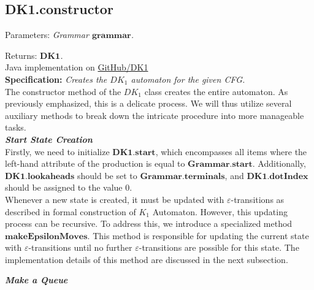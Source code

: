 \vspace{10pt}

\subsection{DK1.constructor}

Parameters: \textit{Grammar \(\boldsymbol{grammar}\).}

Returns: \textit{\(\boldsymbol{DK1}\).}\\

Java implementation on \href{https://github.com/fyfsb/dcfg/blob/main/src/main/java/dk/DK1.java}{GitHub/DK1}\\

\textbf{Specification:} \textit{Creates the \(DK_{1}\) automaton for the given CFG.}\\

The constructor method of the \(DK_{1}\) class creates the entire automaton. As previously emphasized, this is a delicate process. We will thus utilize several auxiliary methods to break down the intricate procedure into more manageable tasks.\\

\textbf{\textit{Start State Creation}}\\

Firstly, we need to initialize \(\boldsymbol{DK1.start}\), which encompasses all items where the left-hand attribute of the production is equal to \(\boldsymbol{Grammar.start}\). Additionally, \(\boldsymbol{DK1.lookaheads}\) should be set to \(\boldsymbol{Grammar.terminals}\), and \(\boldsymbol{DK1.dotIndex}\) should be assigned to the value 0.\\

Whenever a new state is created, it must be updated with \(\varepsilon\)-transitions as described in formal construction of \({K_{1}}\) Automaton. However, this updating process can be recursive. To address this, we introduce a specialized method \(\boldsymbol{makeEpsilonMoves}\). This method is responsible for updating the current state with \(\varepsilon\)-transitions until no further \(\varepsilon\)-transitions are possible for this state. The implementation details of this method are discussed in the next subsection.\\

\vspace{15pt}

\textbf{\textit{Make a Queue}}\\

